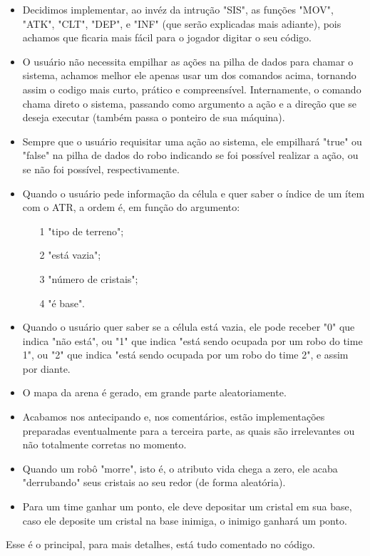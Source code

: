 \documentclass[12pt, a4paper]{article}
\begin{document}
\begin{itemize}
	\item Decidimos implementar, ao invéz da intrução "SIS", as funções "MOV", "ATK", "CLT", "DEP", e "INF" (que serão explicadas mais adiante), pois achamos que ficaria mais fácil para o jogador digitar o seu código.
	\item O usuário não necessita empilhar as ações na pilha de dados para chamar o sistema, achamos melhor ele apenas usar um dos comandos acima, tornando assim o codigo mais curto, prático e compreensível. Internamente, o comando chama direto o sistema, passando como argumento a ação e a direção que se deseja executar (também passa o ponteiro de sua máquina).
	\item Sempre que o usuário requisitar uma ação ao sistema, ele empilhará "true" ou "false" na pilha de dados do robo indicando se foi possível realizar a ação, ou se não foi possível, respectivamente.
	\item Quando o usuário pede informação da célula e quer saber o índice de um ítem com o ATR, a ordem é, em função do argumento: 
	\begin{itemize}
	\item[1] "tipo de terreno"; 
	\item[2]"está vazia"; 
	\item[3]"número de cristais"; 
	\item[4] "é base".
	\end{itemize}
	\item Quando o usuário quer saber se a célula está vazia, ele pode receber "0" que indica "não está", ou "1" que indica "está sendo ocupada por um robo do time 1", ou "2" que indica "está sendo ocupada por um robo do time 2", e assim por diante.
	\item O mapa da arena é gerado, em grande parte aleatoriamente.
	\item Acabamos nos antecipando e, nos comentários, estão implementações preparadas eventualmente para a terceira parte, as quais são irrelevantes ou não totalmente corretas no momento.
	\item Quando um robô "morre", isto é, o atributo vida chega a zero, ele acaba "derrubando" seus cristais ao seu redor (de forma aleatória).
	\item Para um time ganhar um ponto, ele deve depositar um cristal em sua base, caso ele deposite um cristal na base inimiga, o inimigo ganhará um ponto.
\end{itemize}
Esse é o principal, para mais detalhes, está tudo comentado no código.
\end{document}
